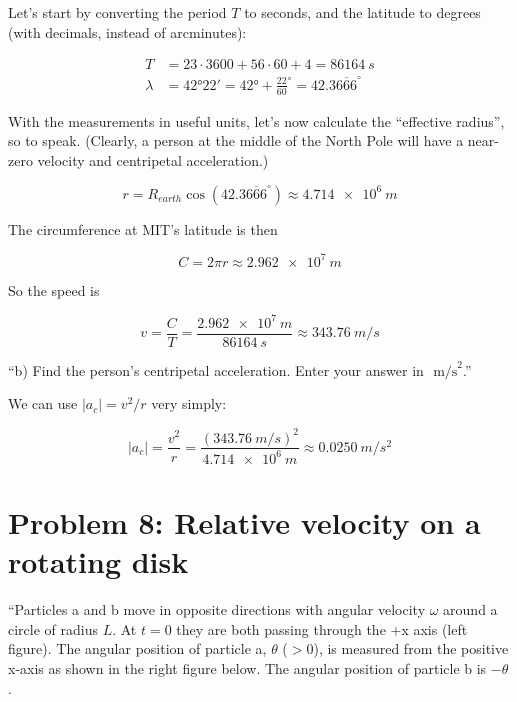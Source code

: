 \documentclass[8.01x]{subfiles}
\begin{document}
Let's start by converting the period $T$ to seconds, and the latitude to degrees (with decimals, instead of arcminutes):

\begin{align}
T &= 23 \cdot 3600 + 56 \cdot 60 + 4 = \SI{86164}{s}\\
\lambda &= \ang{42;22;} = \ang{42} + \frac{22}{60}^\circ = 42.3\overbar{666}^\circ
\end{align}

With the measurements in useful units, let's now calculate the ``effective radius'', so to speak. (Clearly, a person at the middle of the North Pole will have a near-zero velocity and centripetal acceleration.)

\begin{equation}
r = R_{earth} \cos(42.3\overbar{666}^\circ) \approx \SI{4.714e6}{m}
\end{equation}

The circumference at MIT's latitude is then

\begin{equation}
C = 2 \pi r \approx \SI{2.962e7}{m}
\end{equation}

So the speed is

\begin{equation}
v = \frac{C}{T} = \frac{\SI{2.962e7}{m}}{\SI{86164}{s}} \approx \SI{343.76}{m/s}
\end{equation}

``b) Find the person's centripetal acceleration. Enter your answer in $\text{ m/s}^2$.''

We can use $|a_c| = v^2/r$ very simply:

\begin{equation}
|a_c| = \frac{v^2}{r} = \frac{(\SI{343.76}{m/s})^2}{\SI{4.714e6}{m}} \approx \SI{0.0250}{m/s^2}
\end{equation}

\section{Problem 8: Relative velocity on a rotating disk}

``Particles a and b move in opposite directions with angular velocity $\omega$ around a circle of radius $L$. At $t = 0$ they are both passing through the +x axis (left figure). The angular position of particle a, $\theta$ ($>0$), is measured from the positive x-axis as shown in the right figure below. The angular position of particle b is $-\theta$.
\end{document}
